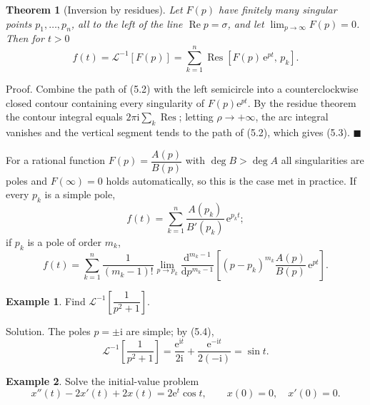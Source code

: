 \documentclass[11pt,a4paper]{article}
\theoremstyle{definition}
\newtheorem{example}{Example}[section]
\theoremstyle{plain}
\newtheorem{theorem}{Theorem}[section]
\begin{document}
\begin{theorem}[Inversion by residues]
Let $F(p)$ have finitely many singular points $p_1,\dots,p_n$, all to the left of the line
$\operatorname{Re}p=\sigma$, and let $\lim_{p\to\infty}F(p)=0$. Then for $t>0$
\begin{equation}
f(t)=\mathcal{L}^{-1}\left[F(p)\right]
=\sum_{k=1}^{n}\operatorname{Res}\left[F(p)\,\mathrm{e}^{pt},\,p_k\right]. \tag{5.3}
\end{equation}
\end{theorem}

Proof. Combine the path of (5.2) with the left semicircle into a counterclockwise closed
contour containing every singularity of $F(p)\mathrm{e}^{pt}$. By the residue theorem the contour
integral equals $2\pi\mathrm{i}\sum_{k}\operatorname{Res}$; letting $\rho\to+\infty$, the arc
integral vanishes and the vertical segment tends to the path of (5.2), which gives (5.3).
\hfill$\blacksquare$

For a rational function $F(p)=\dfrac{A(p)}{B(p)}$ with $\deg B>\deg A$ all singularities are poles
and $F(\infty)=0$ holds automatically, so this is the case met in practice. If every $p_k$ is a
simple pole,
\begin{equation}
f(t)=\sum_{k=1}^{n}\frac{A(p_k)}{B'(p_k)}\,\mathrm{e}^{p_k t} ; \tag{5.4}
\end{equation}
if $p_k$ is a pole of order $m_k$,
\begin{equation}
f(t)=\sum_{k=1}^{n}\frac{1}{(m_k-1)!}\lim_{p\to p_k}\frac{\mathrm{d}^{m_k-1}}
{\mathrm{d}p^{m_k-1}}\left[(p-p_k)^{m_k}\frac{A(p)}{B(p)}\,\mathrm{e}^{pt}\right]. \tag{5.5}
\end{equation}

\begin{samepage}
\begin{example}
Find $\mathcal{L}^{-1}\left[\dfrac{1}{p^2+1}\right]$.
\end{example}

Solution. The poles $p=\pm\mathrm{i}$ are simple; by (5.4),
\begin{equation*}
\mathcal{L}^{-1}\left[\frac{1}{p^2+1}\right]
=\frac{\mathrm{e}^{\mathrm{i}t}}{2\mathrm{i}}+\frac{\mathrm{e}^{-\mathrm{i}t}}{2(-\mathrm{i})}
=\sin t .
\end{equation*}
\end{samepage}

\begin{example}
Solve the initial-value problem
\begin{equation*}
x''(t)-2x'(t)+2x(t)=2\mathrm{e}^{t}\cos t,\qquad x(0)=0,\quad x'(0)=0 .
\end{equation*}
\end{example}
\end{document}
